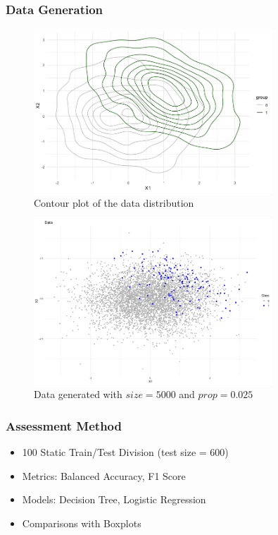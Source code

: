 \documentclass{beamer}
\begin{document}
\begin{frame}
  \frametitle{Data Generation}
  \begin{figure}
    \centering
    \includegraphics[width=0.8\textwidth]{figures/contour_data.png}
    \caption{Contour plot of the data distribution}
    \label{fig:contour_data}
  \end{figure}
\end{frame}

\begin{frame}
  \begin{figure}
    \centering
    \includegraphics[width=0.8\textwidth]{figures/data.png}
    \caption{Data generated with $size = 5000$ and $prop = 0.025$}
    \label{fig:data}
  \end{figure}
\end{frame}


\begin{frame}
  \frametitle{Assessment Method}
  \begin{itemize}
    \item 100 Static Train/Test Division (test size = 600)
    \item Metrics: Balanced Accuracy, F1 Score
    \item Models: Decision Tree, Logistic Regression
    \item Comparisons with Boxplots
  \end{itemize}
\end{frame}
\end{document}
